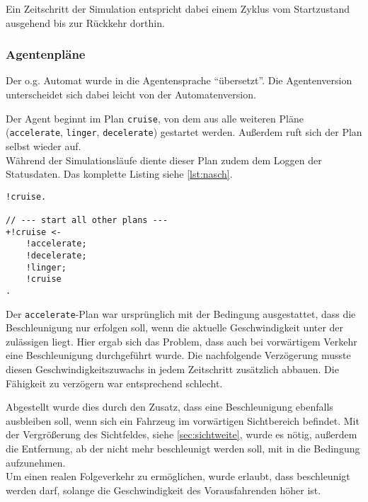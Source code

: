 Ein Zeitschritt der Simulation entspricht dabei einem Zyklus vom Startzustand ausgehend bis zur Rückkehr dorthin.


\subsubsection{Agentenpläne}

Der o.g. Automat wurde in die Agentensprache \enquote{übersetzt}. 
Die Agentenversion unterscheidet sich dabei leicht von der Automatenversion. 

Der Agent beginnt im Plan \texttt{cruise}, von dem aus alle weiteren Pläne (\texttt{accelerate}, \texttt{linger}, \texttt{decelerate}) gestartet werden.
Außerdem ruft sich der Plan selbst wieder auf.
\\
Während der Simulationsläufe diente dieser Plan zudem dem Loggen der Statusdaten.
Das komplette Listing siehe \cref{lst:nasch}.

\begin{minipage}[hptb]{0.95\textwidth}
\begin{lstlisting}[style=asl, 
                   keywords={!cruise}, 
                   keywords={[2]}, 
                   keywords={[3]}, 
                   caption={Auszug aus Agentenscript: single lane-Version},
                   label={lst:nasch-auszug}]      
!cruise.

// --- start all other plans ---
+!cruise <-
    !accelerate;
    !decelerate;
    !linger;
    !cruise
.\end{lstlisting}
\end{minipage}

Der \texttt{accelerate}-Plan war ursprünglich mit der Bedingung ausgestattet, dass die Beschleunigung nur erfolgen soll, wenn die aktuelle Geschwindigkeit unter der zulässigen liegt.
Hier ergab sich das Problem, dass auch bei vorwärtigem Verkehr eine Beschleunigung durchgeführt wurde. Die nachfolgende Verzögerung musste diesen Geschwindigkeitszuwachs in jedem Zeitschritt zusätzlich abbauen.
Die Fähigkeit zu verzögern war entsprechend schlecht.

Abgestellt wurde dies durch den Zusatz, dass eine Beschleunigung ebenfalls ausbleiben soll, wenn sich ein Fahrzeug im vorwärtigen Sichtbereich befindet.
Mit der Vergrößerung des Sichtfeldes, siehe \cref{sec:sichtweite}, wurde es nötig, außerdem die Entfernung, ab der nicht mehr beschleunigt werden soll, mit in die Bedingung aufzunehmen.
\\
Um einen realen Folgeverkehr zu ermöglichen, wurde erlaubt, dass beschleunigt werden darf, solange die Geschwindigkeit des Vorausfahrenden höher ist.

